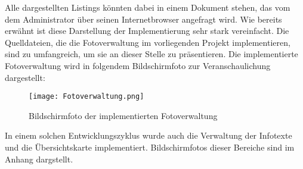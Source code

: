 

Alle dargestellten Listings könnten dabei in einem Dokument stehen, das vom dem Administrator über seinen Internetbrowser angefragt wird.
Wie bereits erwähnt ist diese Darstellung der Implementierung sehr stark vereinfacht. Die Quelldateien, die die Fotoverwaltung im vorliegenden Projekt implementieren, sind zu umfangreich, um sie an dieser Stelle zu präsentieren. Die implementierte Fotoverwaltung wird in folgendem Bildschirmfoto zur Veranschaulichung dargestellt:

\begin{figure}[htb]
\centering
\texttt{[image: Fotoverwaltung.png]}
\caption[Fotoverwaltung]{Bildschirmfoto der implementierten Fotoverwaltung}
\label{fig:Fotoverwaltung}
\end{figure}

In einem solchen Entwicklungszyklus wurde auch die Verwaltung der Infotexte und die Übersichtskarte implementiert. Bildschirmfotos dieser Bereiche sind im Anhang dargstellt.